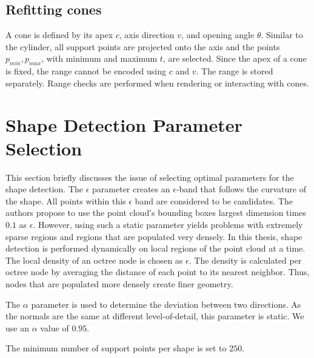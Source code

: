 \subsection{Refitting cones}

A cone is defined by its apex $c$, axis direction $v$, and opening angle $\theta$. Similar to the cylinder, all support points are projected onto the axis and the points $p_{min}, p_{max}$, with minimum and maximum $t$, are selected. Since the apex of a cone is fixed, the range cannot be encoded using $c$ and $v$. The range is stored separately. Range checks are performed when rendering or interacting with cones. 


\section{Shape Detection Parameter Selection}
\label{sec:shapeDetectionParameterSelection}

This section briefly discusses the issue of selecting optimal parameters for the shape detection. The $\epsilon$ parameter creates an $\epsilon$-band that follows the curvature of the shape. All points within this $\epsilon$ band are considered to be candidates. The authors propose to use the point cloud's bounding boxes largest dimension times $0.1$ as $\epsilon$. However, using such a static parameter yields problems with extremely sparse regions and regions that are populated very densely. In this thesis, shape detection is performed dynamically on local regions of the point cloud at a time. The local density of an octree node is chosen as $\epsilon$. The density is calculated per octree node by averaging the distance of each point to its nearest neighbor. Thus, nodes that are populated more densely create finer geometry. 

The $\alpha$ parameter is used to determine the deviation between two directions. As the normals are the same at different level-of-detail, this parameter is static. We use an $\alpha$ value of $0.95$. 

The minimum number of support points per shape is set to $250$.